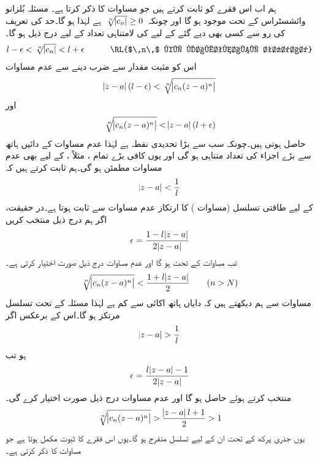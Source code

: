ہم اب اس فقرے کو ثابت کرتے ہیں جو مساوات  کا ذکر کرتا ہے۔ مسئلہ بُلزانو وائشسٹراس  کے تحت  موجود ہو گا اور چونکہ
$\,\sqrt[\leftroot{-2}n]{\abs{c_n}}\ge 0\,$
ہے لہٰذا  ہو گا۔حد کی تعریف کی رو سے  کسی بھی دیے گئے  کے لیے  کی لامتناہی تعداد کے لیے درج ذیل ہو گا۔
\begin{align*}
l-\epsilon<\sqrt[\leftroot{-2}n]{\abs{c_n}}<l+\epsilon\quad \quad \quad \text{\RL{$\,n\,$ کی لامتناہی تعداد}}
\end{align*}
اس کو مثبت مقدار  سے ضرب دینے سے عدم مساوات
\begin{align}\label{مساوات_ٹیلر_رداس_ارتکاز_پ}
\abs{z-a}(l-\epsilon)<\sqrt[\leftroot{-2}n]{\abs{c_n(z-a)^n}}
\end{align}
اور
\begin{align}\label{مساوات_ٹیلر_رداس_ارتکاز_ت}
\sqrt[\leftroot{-2}n]{\abs{c_n(z-a)^n}}<\abs{z-a}(l+\epsilon)
\end{align}
حاصل ہوتی ہیں۔چونکہ  سب سے بڑا تحدیدی نقطہ ہے لہٰذا  عدم مساوات  کے دائیں ہاتھ سے بڑے اجزاء کی تعداد متناہی ہو گی اور یوں 
 کافی بڑے تمام ، مثلاً ، کے لیے بھی عدم مساوات  مطمئن ہو گی۔ہم ثابت کرتے ہیں کہ
\begin{align}\label{مساوات_ٹیلر_رداس_ارتکاز_ٹ}
\abs{z-a}<\frac{1}{l}
\end{align}
کے لیے طاقتی تسلسل (مساوات ) کا ارتکاز  عدم مساوات  سے ثابت ہوتا ہے۔در حقیقت، اگر ہم درج ذیل منتخب کریں
\begin{align*}
\epsilon=\frac{1-l\abs{z-a}}{2\abs{z-a}}
\end{align*}
تب مساوات  کے تحت  ہو گا اور عدم مساوات  درج ذیل صورت اختیار کرتی ہے۔
\begin{align*}
\sqrt[\leftroot{-2}n]{\abs{c_n(z-a)^n}}<\frac{1+l\abs{z-a}}{2}\quad \quad (n>N)
\end{align*}
مساوات  سے ہم دیکھتے ہیں کہ دایاں ہاتھ اکائی سے کم ہے لہٰذا مسئلہ  کے تحت تسلسل مرتکز ہو گا۔اس کے برعکس اگر 
\begin{align*}
\abs{z-a}>\frac{1}{l}
\end{align*}
ہو تب
\begin{align*}
\epsilon=\frac{l\abs{z-a}-1}{2\abs{z-a}}
\end{align*}
منتخب کرتے ہوئے  حاصل ہو گا اور  عدم مساوات  درج ذیل صورت اختیار کرے گی۔
\begin{align*}
\sqrt[\leftroot{-2}n]{\abs{c_n(z-a)^n}}>\frac{\abs{z-a}l+1}{2}>1
\end{align*}
یوں جذری پرکھ کے تحت ان  کے لیے تسلسل منفرج ہو گا۔یوں اس فقرے کا ثبوت مکمل ہوتا ہے  جو مساوات  کا ذکر کرتی ہے۔

